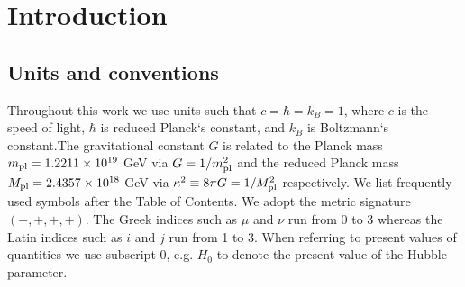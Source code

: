 \chapter*{Introduction}

\section*{Units and conventions}

Throughout this work we use units such that $c=\hbar=k_B=1$, where $c$ is the speed of light, $\hbar$ is reduced Planck`s constant, and $k_B$ is Boltzmann`s constant.The gravitational constant $G$ is related to the Planck mass $m_{\text{\scriptsize pl}}=1.2211\times10^{19}$ GeV via $G=1/m_{\text{\scriptsize pl}}^2$ and the reduced Planck mass $M_{\text{\scriptsize pl}} = 2.4357\times10^{18}$ GeV via $\kappa^2\equiv8\pi G=1/M_{\text{\scriptsize pl}}^2$ respectively. We list frequently used symbols after the Table of Contents. We adopt the metric signature $(-, +, +, +)$. The Greek indices such as $\mu$ and $\nu$ run from 0 to 3 whereas the Latin indices such as $i$ and $j$ run from 1 to 3. When referring to present values of quantities we use subscript $0$, e.g. $H_0$ to denote the present value of the Hubble parameter.